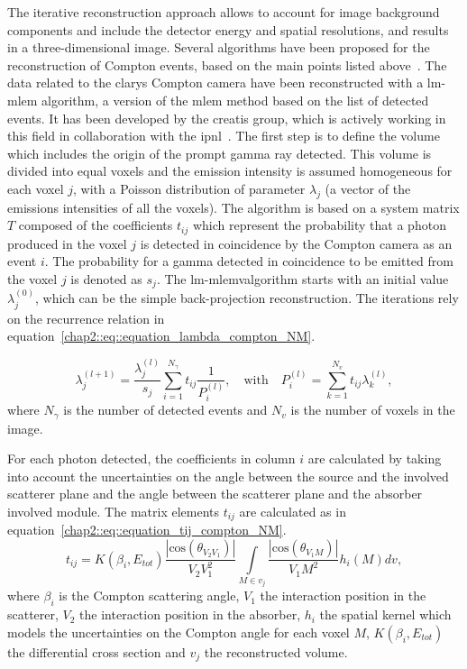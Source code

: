 The iterative reconstruction approach allows to account for image background components and include the detector energy and spatial resolutions, and results in a three-dimensional image. Several algorithms have been proposed for the reconstruction of Compton events, based on the main points listed above~\parencite{Schone2010, Zoglauer2011, Gillam2011, Andreyev2011, Mackin2012, Huang2018, Taya2017, Schone2017}. The data related to the \gls{clarys} Compton camera have been reconstructed with a \gls{lm-mlem} algorithm, a version of the \gls{mlem} method based on the list of detected events. It has been developed by the \gls{creatis} group, which is actively working in this field in collaboration with the \gls{ipnl}~\parencite{Maxim2009, Lojacono2013, Hilaire2014}.
The first step is to define the volume which includes the origin of the prompt gamma ray detected. This volume is divided into equal voxels and the emission intensity is assumed homogeneous for each voxel $j$, with a Poisson distribution of parameter $\lambda_j$ (a vector of the emissions intensities of all the voxels). The algorithm is based on a system matrix $T$ composed of the coefficients $t_{ij}$ which represent the probability that a photon produced in the voxel $j$ is detected in coincidence by the Compton camera as an event $i$. The probability for a gamma detected in coincidence to be emitted from the voxel $j$ is denoted as $s_j$.
The \gls{lm-mlem}valgorithm starts with an initial value $\lambda^{(0)}_j$, which can be the simple back-projection reconstruction.
The iterations rely on the recurrence relation in equation~\ref{chap2::eq::equation_lambda_compton_NM}.

\begin{equation}
\lambda_j^{(l+1)} =  \frac{\lambda_j^{(l)} }{s_j} \sum\limits_{i=1}^{N_{\gamma}} t_{ij} \frac{1}{P_i^{(l)}},\quad \mathrm{with}\quad  P_i^{(l)}=\sum\limits_{k=1}^{N_{v}} t_{ij}\lambda_k^{(l)},
 \label{chap2::eq::equation_lambda_compton_NM}
\end{equation}
where $N_{\gamma}$ is the number of detected events and $N_v$ is the number of voxels in the image.

For each photon detected, the coefficients in column $i$ are calculated by taking into account the uncertainties on the angle between the source and the involved scatterer plane and the angle between the scatterer plane and the absorber involved module.
The matrix elements $t_{ij}$ are calculated as in equation~\ref{chap2::eq::equation_tij_compton_NM}.
\begin{equation}
 t_{ij} = K(\beta_i,E_{tot})\frac{|\mathrm{cos}(\theta_{{V_2V_1}}) |}{V_2V_1^2} \int\limits_{M\in v_j} \frac{|\mathrm{cos}(\theta_{V_1M})|}{V_1M^2} h_i(M)dv,
 \label{chap2::eq::equation_tij_compton_NM}
\end{equation}
where $\beta_i$ is the Compton scattering angle, $V_1$ the interaction position in the scatterer, $V_2$ the interaction position in the absorber, $h_i$ the spatial kernel which models the uncertainties on the Compton angle for each voxel $M$, $K(\beta_i,E_{tot})$ the differential cross section and $v_j$ the reconstructed volume.

